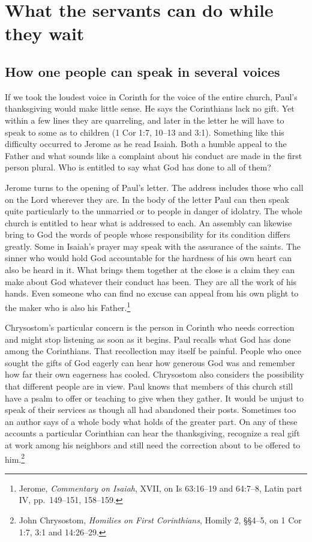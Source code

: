 \section{What the servants can do while they wait}

\subsection{How one people can speak in several voices}

If we took the loudest voice in Corinth for the voice of the entire church, Paul's thanksgiving would make little sense. He says the Corinthians lack no gift. Yet within a few lines they are quarreling, and later in the letter he will have to speak to some as to children (1 Cor 1:7, 10--13 and 3:1). Something like this difficulty occurred to Jerome as he read Isaiah. Both a humble appeal to the Father and what sounds like a complaint about his conduct are made in the first person plural. Who is entitled to say what God has done to all of them?

Jerome turns to the opening of Paul's letter. The address includes those who call on the Lord wherever they are. In the body of the letter Paul can then speak quite particularly to the unmarried or to people in danger of idolatry. The whole church is entitled to hear what is addressed to each. An assembly can likewise bring to God the words of people whose responsibility for its condition differs greatly. Some in Isaiah's prayer may speak with the assurance of the saints. The sinner who would hold God accountable for the hardness of his own heart can also be heard in it. What brings them together at the close is a claim they can make about God whatever their conduct has been. They are all the work of his hands. Even someone who can find no excuse can appeal from his own plight to the maker who is also his Father.\footnote{Jerome, \textit{Commentary on Isaiah}, XVII, on Is 63:16--19 and 64:7--8, Latin part IV, pp.~149--151, 158--159.}

Chrysostom's particular concern is the person in Corinth who needs correction and might stop listening as soon as it begins. Paul recalls what God has done among the Corinthians. That recollection may itself be painful. People who once sought the gifts of God eagerly can hear how generous God was and remember how far their own eagerness has cooled. Chrysostom also considers the possibility that different people are in view. Paul knows that members of this church still have a psalm to offer or teaching to give when they gather. It would be unjust to speak of their services as though all had abandoned their posts. Sometimes too an author says of a whole body what holds of the greater part. On any of these accounts a particular Corinthian can hear the thanksgiving, recognize a real gift at work among his neighbors and still need the correction about to be offered to him.\footnote{John Chrysostom, \textit{Homilies on First Corinthians}, Homily 2, §§4--5, on 1 Cor 1:7, 3:1 and 14:26--29.}

